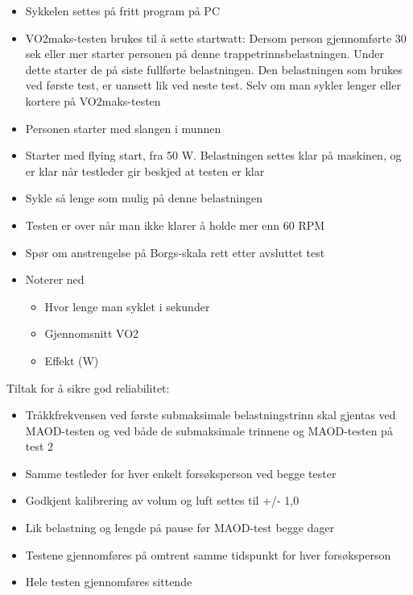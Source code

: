 \documentclass[
  letterpaper,
  DIV=11,
  numbers=noendperiod]{scrartcl}
\providecommand{\tightlist}{%
  \setlength{\itemsep}{0pt}\setlength{\parskip}{0pt}}\usepackage{longtable,booktabs,array}
\begin{document}
\begin{itemize}
\tightlist
\item
  Sykkelen settes på fritt program på PC
\item
  VO2maks-testen brukes til å sette startwatt: Dersom person
  gjennomførte 30 sek eller mer starter personen på denne
  trappetrinnsbelastningen. Under dette starter de på siste fullførte
  belastningen. Den belastningen som brukes ved første test, er uansett
  lik ved neste test. Selv om man sykler lenger eller kortere på
  VO2maks-testen
\item
  Personen starter med slangen i munnen
\item
  Starter med flying start, fra 50 W. Belastningen settes klar på
  maskinen, og er klar når testleder gir beskjed at testen er klar
\item
  Sykle så lenge som mulig på denne belastningen
\item
  Testen er over når man ikke klarer å holde mer enn 60 RPM
\item
  Spør om anstrengelse på Borgs-skala rett etter avsluttet test
\item
  Noterer ned

  \begin{itemize}
  \tightlist
  \item
    Hvor lenge man syklet i sekunder
  \item
    Gjennomsnitt VO2
  \item
    Effekt (W)
  \end{itemize}
\end{itemize}

Tiltak for å sikre god reliabilitet:

\begin{itemize}
\tightlist
\item
  Tråkkfrekvensen ved første submaksimale belastningstrinn skal gjentas
  ved MAOD-testen og ved både de submaksimale trinnene og MAOD-testen på
  test 2
\item
  Samme testleder for hver enkelt forsøksperson ved begge tester
\item
  Godkjent kalibrering av volum og luft settes til +/- 1,0
\item
  Lik belastning og lengde på pause før MAOD-test begge dager
\item
  Testene gjennomføres på omtrent samme tidspunkt for hver forsøksperson
\item
  Hele testen gjennomføres sittende
\end{itemize}
\end{document}
